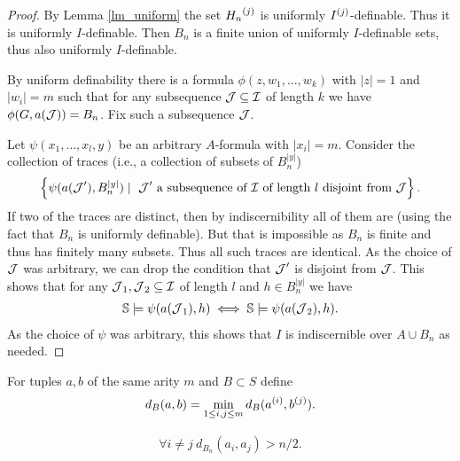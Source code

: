 \begin{proof}
  By Lemma \ref{lm_uniform} the set ${H_n}^{(j)}$ is uniformly ${I}^{(j)}$-definable.
  Thus it is uniformly $I$-definable.
  Then $B_n$ is a finite union of uniformly $I$-definable sets, thus also uniformly $I$-definable.

  By uniform definability there is a formula $\phi(z, w_1, \ldots , w_k)$ with $|z| = 1$ and $|w_i| = m$ such that
  for any subsequence $\operatorname{\mathcal J} \subseteq \operatorname{\mathcal I}$ of length $k$ we have $\phi(G, a(\operatorname{\mathcal J})) = B_n$.
  Fix such a subsequence $\operatorname{\mathcal J}$.

  Let $\psi(x_1, \ldots, x_l ,y)$ be an arbitrary $A$-formula with $|x_i| = m$. 
  Consider the collection of traces (i.e., a collection of subsets of $B_n^{|y|}$)
  \begin{align*}
    \left\{\psi(a(\operatorname{\mathcal J}'), B_n^{|y|}) \mid \text{ $\operatorname{\mathcal J}'$ a subsequence of $\operatorname{\mathcal I}$ of length $l$ disjoint from $\operatorname{\mathcal J}$}\right\}.
  \end{align*}
  If two of the traces are distinct, then by indiscernibility all of them are (using the fact that $B_n$ is uniformly definable).
  But that is impossible as $B_n$ is finite and thus has finitely many subsets.
  Thus all such traces are identical.
  As the choice of $\operatorname{\mathcal J}$ was arbitrary, we can drop the condition that $\operatorname{\mathcal J}'$ is disjoint from $\operatorname{\mathcal J}$.
  This shows that for any $\operatorname{\mathcal J}_1, \operatorname{\mathcal J}_2 \subseteq \operatorname{\mathcal I}$ of length $l$ and $h \in B_n^{|y|}$ we have
  \begin{align*}
    \mathbb S \models \psi(a(\operatorname{\mathcal J}_1), h) \iff \mathbb S \models \psi(a(\operatorname{\mathcal J}_2), h)    .
  \end{align*}
  As the choice of $\psi$ was arbitrary, this shows that $I$ is indiscernible over $A \cup B_n$ as needed.
\end{proof}

\begin{Definition}
  For tuples $a,b$ of the same arity $m$ and $B \subset S$ define
  \begin{align*}
    d_B(a,b) = \min_{1 \leq i,j \leq m} d_B({a}^{(i)}, {b}^{(j)}).
  \end{align*}
\end{Definition}

\begin{Lemma} \label{inf_dis_gen}
  \begin{align*}
    \forall i \neq j \ d_{B_n}(a_i, a_j) > n/2.
  \end{align*}
\end{Lemma}

